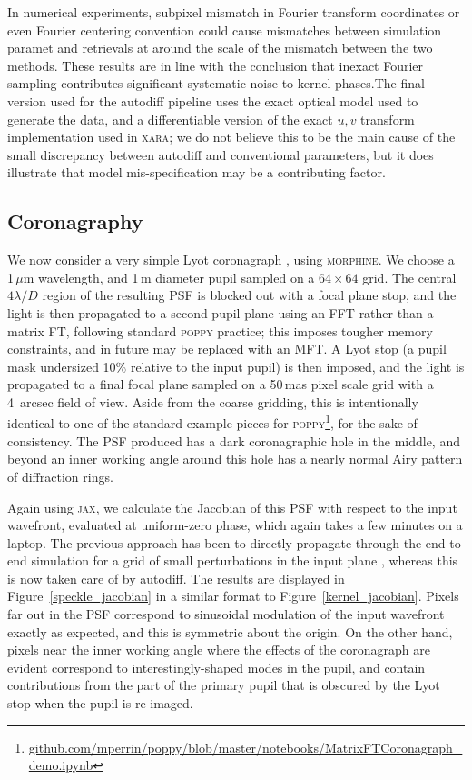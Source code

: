 \documentclass[modern]{aastex63}
\begin{document}
In numerical experiments, subpixel mismatch in Fourier transform coordinates or even Fourier centering convention could cause mismatches between simulation paramet and retrievals at around the scale of the mismatch between the two methods.  These results are in line with the \citet{martinache_habilitation} conclusion that inexact Fourier sampling contributes significant systematic noise to kernel phases.The final version used for the autodiff pipeline uses the exact optical model used to generate the data, and a differentiable version of the exact $u,v$ transform implementation used in \textsc{xara}; we do not believe this to be the main cause of the small discrepancy between autodiff and conventional parameters, but it does illustrate that model mis-specification may be a contributing factor.

\subsection{Coronagraphy}
\label{sec:coronagraph}

We now consider a very simple Lyot coronagraph \citep{lyot30}, using \textsc{morphine}. We choose a 1\,$\mu$m wavelength, and 1\,m diameter pupil sampled on a $64\times64$ grid. The central $4 \lambda/D$ region of the resulting PSF is blocked out with a focal plane stop, and the light is then propagated to a second pupil plane using an FFT rather than a matrix FT, following standard \textsc{poppy} practice; this imposes tougher memory constraints, and in future may be replaced with an MFT. A Lyot stop (a pupil mask undersized 10\% relative to the input pupil) is then imposed, and the light is propagated to a final focal plane sampled on a 50\,mas pixel scale grid with a 4~arcsec field of view. Aside from the coarse gridding, this is intentionally identical to one of the standard example pieces for \textsc{poppy}\footnote{\href{https://github.com/mperrin/poppy/blob/master/notebooks/MatrixFTCoronagraph_demo.ipynb}{github.com/mperrin/poppy/blob/master/notebooks/MatrixFTCoronagraph\_demo.ipynb}}, for the sake of consistency. The PSF produced has a dark coronagraphic hole in the middle, and beyond an inner working angle around this hole has a nearly normal Airy pattern of diffraction rings.

Again using \textsc{jax}, we calculate the Jacobian of this PSF with respect to the input wavefront, evaluated at uniform-zero phase, which again takes a few minutes on a laptop. The previous approach has been to directly propagate through the end to end simulation for a grid of small perturbations in the input plane \citep{falco}, whereas this is now taken care of by autodiff. The results are displayed in Figure~\ref{speckle_jacobian} in a similar format to Figure~\ref{kernel_jacobian}. Pixels far out in the PSF correspond to sinusoidal modulation of the input wavefront exactly as expected, and this is symmetric about the origin. On the other hand, pixels near the inner working angle where the effects of the coronagraph are evident correspond to interestingly-shaped modes in the pupil, and contain contributions from the part of the primary pupil that is obscured by the Lyot stop when the pupil is re-imaged. 
\end{document}
